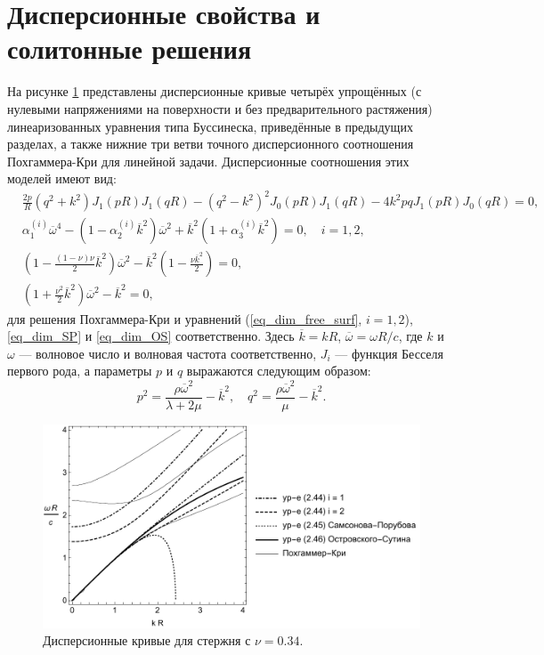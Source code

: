 \documentclass[12pt, a4paper]{report}
\begin{document}
\section{Дисперсионные свойства и солитонные решения}

На рисунке \ref{fig:disp} представлены дисперсионные кривые четырёх упрощённых (с нулевыми напряжениями на поверхности и без предварительного растяжения) линеаризованных уравнения типа Буссинеска, приведённые в предыдущих разделах, а также нижние три ветви точного дисперсионного соотношения Похгаммера-Кри для линейной задачи.
Дисперсионные соотношения этих моделей имеют вид:
\begin{align}
&\frac{2p}{R}\left(q^2 + k^2\right) J_1(pR) J_1(qR) - \left(q^2 - k^2\right)^2 J_0(pR) J_1(qR) -4k^2 p q J_1(pR) J_0(qR) = 0,\\
& \alpha_1^{(i)} \overline{\omega}^4 - \left(1 - \alpha_2^{(i)} \overline{k}^2\right) \overline{\omega}^2 + \overline{k}^2 \left(1 + \alpha_3^{(i)} \overline{k}^2 \right) = 0, \quad i = 1,2,\\
& \left(1 - \frac{(1-\nu)\nu}{2} \overline{k}^2\right) \overline{\omega}^2 - \overline{k}^2 \left(1 - \frac{\nu  \overline{k}^2}{2}\right) = 0,\\
& \left(1 + \frac{\nu^2}{2} \overline{k}^2\right) \overline{\omega}^2 - \overline{k}^2 = 0,
\end{align}
для решения Похгаммера-Кри и уравнений (\ref{eq_dim_free_surf}, $i=1,2$), \eqref{eq_dim_SP} и \eqref{eq_dim_OS} соответственно. Здесь $\overline{k} = k R$, $\overline{\omega} = \omega R / c$, где $k$ и $\omega$ --- волновое число и волновая частота соответственно, $J_i$ --- функция Бесселя первого рода, а параметры $p$ и $q$ выражаются следующим образом:
\begin{equation*}
p^2 = \frac{\rho \overline{\omega}^2}{\lambda + 2\mu} - \overline{k}^2, \quad q^2 = \frac{\rho \overline{\omega}^2}{\mu} - \overline{k}^2.
\end{equation*}

\begin{figure}[h]
	\centering
	\includegraphics[width=0.85\linewidth]{2_DispBlack}
	\caption{Дисперсионные кривые для стержня с $\nu = 0.34$.}
	\label{fig:disp}
\end{figure} 
\end{document}

